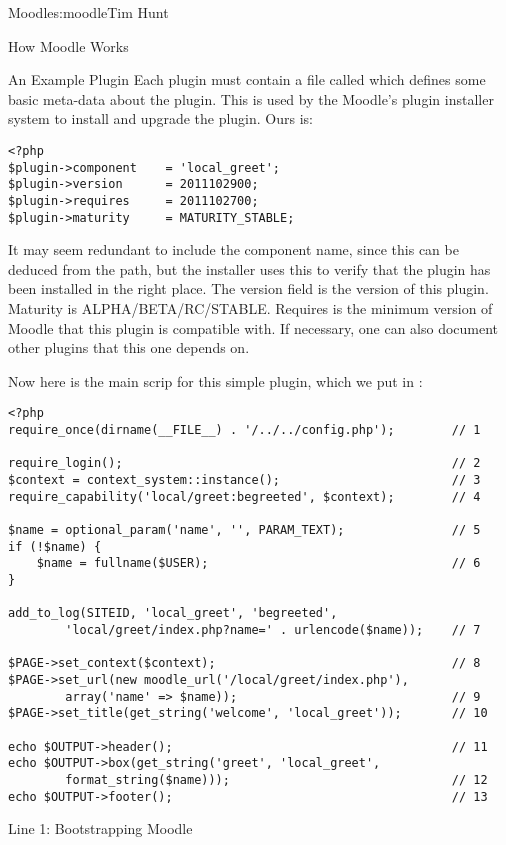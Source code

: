 \begin{aosachapter}{Moodle}{s:moodle}{Tim Hunt}
\begin{aosasect1}{How Moodle Works}
\begin{aosasect2}{An Example Plugin}
Each plugin must contain a file called  which
defines some basic meta-data about the plugin. This is used by the
Moodle's plugin installer system to install and upgrade the plugin.
Ours is:

\begin{verbatim}
<?php
$plugin->component    = 'local_greet';
$plugin->version      = 2011102900;
$plugin->requires     = 2011102700;
$plugin->maturity     = MATURITY_STABLE;
\end{verbatim}

It may seem redundant to include the component name, since this can be
deduced from the path, but the installer uses this to verify that the
plugin has been installed in the right place. The version field is the
version of this plugin. Maturity is ALPHA/BETA/RC/STABLE. Requires is
the minimum version of Moodle that this plugin is compatible with. If
necessary, one can also document other plugins that this one depends
on.

Now here is the main scrip for this simple plugin, which we put
in :

\begin{verbatim}
<?php
require_once(dirname(__FILE__) . '/../../config.php');        // 1

require_login();                                              // 2
$context = context_system::instance();                        // 3
require_capability('local/greet:begreeted', $context);        // 4

$name = optional_param('name', '', PARAM_TEXT);               // 5
if (!$name) {
    $name = fullname($USER);                                  // 6
}

add_to_log(SITEID, 'local_greet', 'begreeted',
        'local/greet/index.php?name=' . urlencode($name));    // 7

$PAGE->set_context($context);                                 // 8
$PAGE->set_url(new moodle_url('/local/greet/index.php'),
        array('name' => $name));                              // 9
$PAGE->set_title(get_string('welcome', 'local_greet'));       // 10

echo $OUTPUT->header();                                       // 11
echo $OUTPUT->box(get_string('greet', 'local_greet',
        format_string($name)));                               // 12
echo $OUTPUT->footer();                                       // 13
\end{verbatim}

\begin{aosasect3}{Line 1: Bootstrapping Moodle}


\end{aosasect3}
\end{aosasect2}
\end{aosasect1}
\end{aosachapter}
